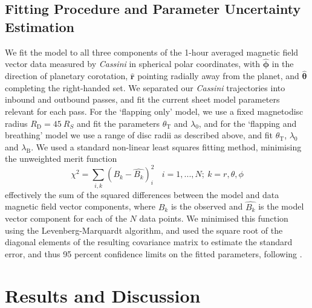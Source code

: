 \subsection{Fitting Procedure and Parameter Uncertainty Estimation}
We fit the model to all three components of the 1-hour averaged magnetic field vector data measured by \textit{Cassini} in spherical polar coordinates, with $\boldsymbol{\hat{\phi}}$ in the direction of planetary corotation, $\boldsymbol{\hat{r}}$ pointing radially away from the planet, and $\boldsymbol{\hat{\theta}}$ completing the right-handed set. We separated our \textit{Cassini} trajectories into inbound and outbound passes, and fit the current sheet model parameters relevant for each pass. For the `flapping only' model, we use a fixed magnetodisc radius $R_\mathrm{D} = \SI{45}{R_S}$ and fit the parameters $\theta_\mathrm{T}$ and $\lambda_0$, and for the `flapping and breathing' model we use a range of disc radii as described above, and fit $\theta_\mathrm{T}$, $\lambda_0$ and $\lambda_\mathrm{B}$. We used a standard non-linear least squares fitting method, minimising the unweighted merit function
\begin{equation}
\chi^2 = \sum\limits_{i,k}(B_{k}-\hat{B_{k}})_i^2~~~~i = 1,...,N;~k = r,\theta,\phi
\end{equation}
effectively the sum of the squared differences between the model and data magnetic field vector components, where $B_k$ is the observed and $\hat{B_k}$ is the model vector component for each of the $N$ data points. We minimised this function using the Levenberg-Marquardt algorithm, and used the square root of the diagonal elements of the resulting covariance matrix to estimate the standard error, and thus 95 percent confidence limits on the fitted parameters, following \citet{press2007}.

\section{Results and Discussion}\label{equinox:sec:results}
